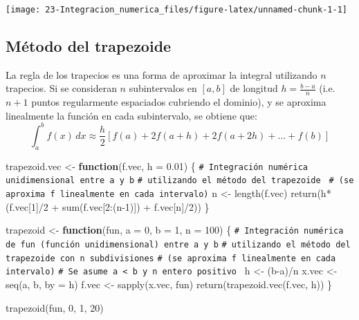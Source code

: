 \documentclass[
  10pt,
]{book}
\newenvironment{Shaded}{\begin{snugshade}}{\end{snugshade}}
\newcommand{\AttributeTok}[1]{\textcolor[rgb]{0.77,0.63,0.00}{#1}}
\newcommand{\CommentTok}[1]{\textcolor[rgb]{0.56,0.35,0.01}{\textit{#1}}}
\newcommand{\ControlFlowTok}[1]{\textcolor[rgb]{0.13,0.29,0.53}{\textbf{#1}}}
\newcommand{\DecValTok}[1]{\textcolor[rgb]{0.00,0.00,0.81}{#1}}
\newcommand{\FloatTok}[1]{\textcolor[rgb]{0.00,0.00,0.81}{#1}}
\newcommand{\FunctionTok}[1]{\textcolor[rgb]{0.00,0.00,0.00}{#1}}
\newcommand{\NormalTok}[1]{#1}
\newcommand{\OtherTok}[1]{\textcolor[rgb]{0.56,0.35,0.01}{#1}}
\newcommand{\SpecialCharTok}[1]{\textcolor[rgb]{0.00,0.00,0.00}{#1}}
\theoremstyle{break}
\theoremstyle{nonumberplain}
\renewcommand{\CommentTok}[1]{\textcolor[rgb]{0.41,0.41,0.41}{\texttt{#1}}}
\begin{document}
\begin{center}\texttt{[image: 23-Integracion\_numerica\_files/figure-latex/unnamed-chunk-1-1]} \end{center}

\hypertarget{muxe9todo-del-trapezoide}{%
\subsection{Método del trapezoide}\label{muxe9todo-del-trapezoide}}

La regla de los trapecios es una forma de aproximar la integral utilizando \(n\) trapecios.
Si se consideran \(n\) subintervalos en \([a,b]\) de longitud \(h= \frac{b-a}{n}\)
(i.e.~\(n + 1\) puntos regularmente espaciados cubriendo el dominio), y
se aproxima linealmente la función en cada subintervalo, se obtiene que:
\[\int_a^b f(x)\, dx \approx \frac{h}{2} [f(a)+2f(a+h)+2f(a+2h)+...+f(b)]\]

\begin{Shaded}
\begin{Highlighting}[]
\NormalTok{trapezoid.vec }\OtherTok{\textless{}{-}} \ControlFlowTok{function}\NormalTok{(f.vec, }\AttributeTok{h =} \FloatTok{0.01}\NormalTok{) \{}
\CommentTok{\# Integración numérica unidimensional entre a y b}
\CommentTok{\# utilizando el método del trapezoide }
\CommentTok{\# (se aproxima f linealmente en cada intervalo)}
\NormalTok{  n }\OtherTok{\textless{}{-}} \FunctionTok{length}\NormalTok{(f.vec) }
  \FunctionTok{return}\NormalTok{(h}\SpecialCharTok{*}\NormalTok{(f.vec[}\DecValTok{1}\NormalTok{]}\SpecialCharTok{/}\DecValTok{2} \SpecialCharTok{+} \FunctionTok{sum}\NormalTok{(f.vec[}\DecValTok{2}\SpecialCharTok{:}\NormalTok{(n}\DecValTok{{-}1}\NormalTok{)]) }\SpecialCharTok{+}\NormalTok{ f.vec[n]}\SpecialCharTok{/}\DecValTok{2}\NormalTok{))}
\NormalTok{\}}

\NormalTok{trapezoid }\OtherTok{\textless{}{-}} \ControlFlowTok{function}\NormalTok{(fun, }\AttributeTok{a =} \DecValTok{0}\NormalTok{, }\AttributeTok{b =} \DecValTok{1}\NormalTok{, }\AttributeTok{n =} \DecValTok{100}\NormalTok{) \{}
\CommentTok{\# Integración numérica de fun (función unidimensional) entre a y b}
\CommentTok{\# utilizando el método del trapezoide con n subdivisiones}
\CommentTok{\# (se aproxima f linealmente en cada intervalo)}
\CommentTok{\# Se asume a \textless{} b y n entero positivo }
\NormalTok{  h }\OtherTok{\textless{}{-}}\NormalTok{ (b}\SpecialCharTok{{-}}\NormalTok{a)}\SpecialCharTok{/}\NormalTok{n}
\NormalTok{  x.vec }\OtherTok{\textless{}{-}} \FunctionTok{seq}\NormalTok{(a, b, }\AttributeTok{by =}\NormalTok{ h)}
\NormalTok{  f.vec }\OtherTok{\textless{}{-}} \FunctionTok{sapply}\NormalTok{(x.vec, fun)}
  \FunctionTok{return}\NormalTok{(}\FunctionTok{trapezoid.vec}\NormalTok{(f.vec, h))}
\NormalTok{\}}

\FunctionTok{trapezoid}\NormalTok{(fun, }\DecValTok{0}\NormalTok{, }\DecValTok{1}\NormalTok{, }\DecValTok{20}\NormalTok{)}
\end{Highlighting}
\end{Shaded}
\end{document}

